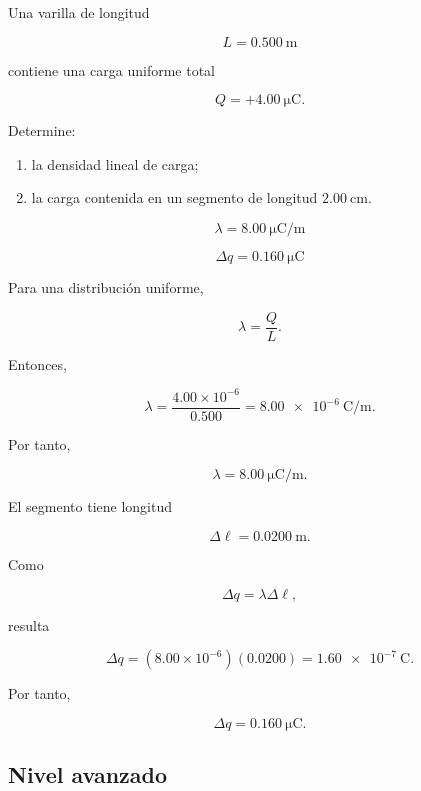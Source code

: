 \begin{ejercicio}

Una varilla de longitud

\[
L=\SI{0.500}{\metre}
\]

contiene una carga uniforme total

\[
Q=+\SI{4.00}{\micro\coulomb}.
\]

Determine:

\begin{enumerate}
    \item la densidad lineal de carga;
    \item la carga contenida en un segmento de longitud \(\SI{2.00}{\centi\metre}\).
\end{enumerate}

\end{ejercicio}

\begin{respuesta}

\[
\boxed{\lambda=\SI{8.00}{\micro\coulomb\per\metre}}
\]

\[
\boxed{\Delta q=\SI{0.160}{\micro\coulomb}}
\]

\end{respuesta}

\begin{explicacion}

Para una distribución uniforme,

\[
\lambda=\frac{Q}{L}.
\]

Entonces,

\[
\lambda=\frac{4.00\times10^{-6}}{0.500}
=\SI{8.00e-6}{\coulomb\per\metre}.
\]

Por tanto,

\[
\boxed{\lambda=\SI{8.00}{\micro\coulomb\per\metre}}.
\]

El segmento tiene longitud

\[
\Delta\ell=\SI{0.0200}{\metre}.
\]

Como

\[
\Delta q=\lambda\Delta\ell,
\]

resulta

\[
\Delta q=(8.00\times10^{-6})(0.0200)
=\SI{1.60e-7}{\coulomb}.
\]

Por tanto,

\[
\boxed{\Delta q=\SI{0.160}{\micro\coulomb}}.
\]

\end{explicacion}


\subsection{Nivel avanzado}

